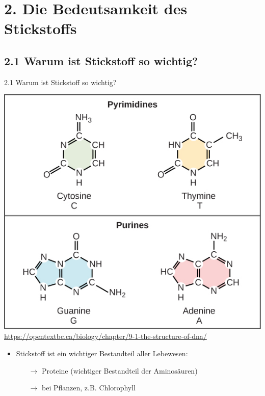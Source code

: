 \documentclass[
    aspectratio=1610
    ]{beamer}
\begin{document}
    \section{\textbf{2.} Die Bedeutsamkeit des Stickstoffs}
    
    \subsection{\textbf{2.1} Warum ist Stickstoff so wichtig?}
    
    \begin{frame}{2.1 Warum ist Stickstoff so wichtig?}
        \begin{minipage}{6.5cm}
            \vspace{.5cm}\includegraphics[scale=.7]{figures/DNA_BASES.jpg}
            \color{gray}\tiny\url{https://opentextbc.ca/biology/chapter/9-1-the-structure-of-dna/}
        \end{minipage}
        \begin{minipage}{7cm}
            \begin{itemize}
                \item Stickstoff ist ein wichtiger Bestandteil aller Lebewesen:
                \begin{itemize}
                    \item[$\rightarrow$] Proteine (wichtiger Bestandteil der Aminosäuren)
                    \item[$\rightarrow$] bei Pflanzen, z.B. Chlorophyll

\end{itemize}
\end{itemize}
\end{minipage}
\end{frame}
\end{document}
